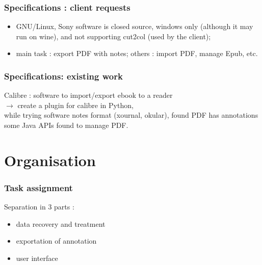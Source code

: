 \documentclass[t,12pt]{beamer}
\begin{document}
\begin{frame}
  \frametitle{Specifications : client requests}
  \begin{itemize}
    \item GNU/Linux,
    \pause Sony software is closed source, windows only (although
    it may run on wine), and not supporting cut2col (used by the
    client);
    \pause \item main task : export PDF with notes; \pause others :
    import PDF, manage Epub, etc.
  \end{itemize}
\end{frame}

\begin{frame}
  \frametitle{Specifications: existing work}
  Calibre : software to import/export ebook to a reader\\
  $\rightarrow$ create a plugin for calibre in Python,\\
  \pause while trying software notes format (xournal, okular),
  found PDF has annotations\\
  \pause some Java APIs found to manage PDF.
\end{frame}

\section{Organisation}
\begin{frame}
  \frametitle{Task assignment}
  Separation in 3 parts :
  \begin{itemize}
    \pause \item data recovery and treatment
	\pause \item exportation of annotation
	\pause \item user interface
  \end{itemize}
\end{frame}
\end{document}
